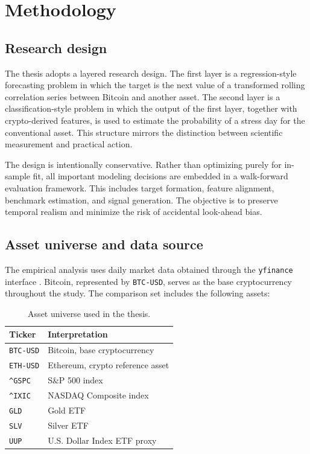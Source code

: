 ﻿\section{Methodology}

\subsection{Research design}

The thesis adopts a layered research design. The first layer is a regression-style forecasting problem in which the target is the next value of a transformed rolling correlation series between Bitcoin and another asset. The second layer is a classification-style problem in which the output of the first layer, together with crypto-derived features, is used to estimate the probability of a stress day for the conventional asset. This structure mirrors the distinction between scientific measurement and practical action.

The design is intentionally conservative. Rather than optimizing purely for in-sample fit, all important modeling decisions are embedded in a walk-forward evaluation framework. This includes target formation, feature alignment, benchmark estimation, and signal generation. The objective is to preserve temporal realism and minimize the risk of accidental look-ahead bias.

\subsection{Asset universe and data source}

The empirical analysis uses daily market data obtained through the \texttt{yfinance} interface \cite{yfinance2026}. Bitcoin, represented by \texttt{BTC-USD}, serves as the base cryptocurrency throughout the study. The comparison set includes the following assets:

\begin{table}[H]
    \centering
    \caption{Asset universe used in the thesis.}
    \label{tab:asset_universe}
    \begin{tabular}{ll}
        \toprule
        Ticker & Interpretation \\
        \midrule
        \texttt{BTC-USD} & Bitcoin, base cryptocurrency \\
        \texttt{ETH-USD} & Ethereum, crypto reference asset \\
        \texttt{\^{}GSPC} & S\&P 500 index \\
        \texttt{\^{}IXIC} & NASDAQ Composite index \\
        \texttt{GLD} & Gold ETF \\
        \texttt{SLV} & Silver ETF \\
        \texttt{UUP} & U.S. Dollar Index ETF proxy \\
        \bottomrule
    \end{tabular}
\end{table}

